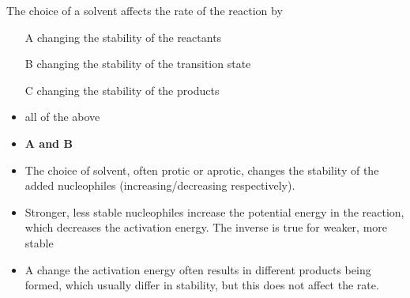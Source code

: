 \documentclass[12pt,a4paper]{article}
\begin{document}
\begin{enumerate}
\begin{itemize}
        \end{itemize}
    {\color{G-Moon}\item The choice of a solvent affects the rate of the reaction by
    \begin{itemize}
        \item[A] changing the stability of the reactants
        \item[B] changing the stability of the transition state
        \item[C] changing the stability of the products
        \item all of the above
        \item {\color{o-Sun}\textbf{A and B}}
    \end{itemize}}
        \begin{itemize}
            \item The choice of solvent, often protic or aprotic, changes the stability of the added nucleophiles (increasing/decreasing respectively). 
            \item Stronger, less stable nucleophiles increase the potential energy in the reaction, which decreases the activation energy. The inverse is true for weaker, more stable 
            \item A change the activation energy often results in different products being formed, which usually differ in stability, but this does not affect the rate.
        \end{itemize}
\end{enumerate}
\end{document}
